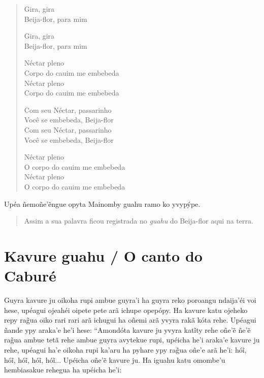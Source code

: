 
\begin{verse}
Gira, gira\\
Beija-flor, para mim

Gira, gira\\
Beija-flor, para mim

Néctar pleno\\
Corpo\footnotemark{} do cauim me embebeda\\
Néctar pleno\\
Corpo do cauim me embebeda

Com seu Néctar, passarinho\\
Você se embebeda, Beija-flor\\
Com seu Néctar, passarinho\\
Você se embebeda, Beija-flor

Néctar pleno\\
O corpo do cauim me embebeda\\
Néctar pleno\\
O corpo do cauim me embebeda
\end{verse}


Upéa ñemoñe'ẽngue opyta Mainomby guahu ramo ko yvypýpe.

\begin{quote}
Assim a sua palavra ficou registrada no \emph{guahu} do Beija-flor aqui
na terra.
\end{quote}

\chapter{Kavure guahu / O canto do Caburé}

Guyra kavure ju oikoha rupi ambue guyra'i ha guyra reko poroangu
ndaija'éi voi hese, upéagui ojeahéi oipete pete arã ichupe opepópy. Ha
kavure katu ojeheko repy rag̃ua oiko rari rari arã ichugui ha oñemi arã
yvyra rakã kóta rehe. Upéagui ñande ypy araka'e he'i hese: ``Amondóta
kavure ju yvyra katĩty rehe oñe'ẽ ñe'ẽ rag̃ua ambue tetã rehe ambue guyra
avytekue rupi, upéicha he'i araka'e kavure ju rehe, upéagui ha'e oikoha
rupi ka'aru ha pyhare ypy rag̃ua oñe'e arã he'i: hóĩ, hóĩ, hóĩ, hóĩ,
hóĩ... Upéicha oñe'ẽ kavure ju. Ha iguahu katu omombe'u hembiasakue
rehegua ha upéicha he'i:

